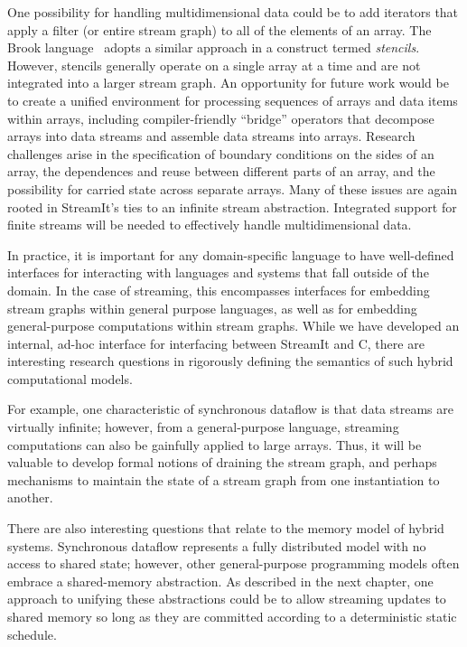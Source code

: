   One possibility for handling multidimensional data could be to add
  iterators that apply a filter (or entire stream graph) to all of the
  elements of an array.  The Brook language~\cite{brook04} adopts a
  similar approach in a construct termed {\it stencils}.  However,
  stencils generally operate on a single array at a time and are not
  integrated into a larger stream graph.  An opportunity for future
  work would be to create a unified environment for processing
  sequences of arrays and data items within arrays, including
  compiler-friendly ``bridge'' operators that decompose arrays into
  data streams and assemble data streams into arrays.  Research
  challenges arise in the specification of boundary conditions on the
  sides of an array, the dependences and reuse between different parts
  of an array, and the possibility for carried state across separate
  arrays.  Many of these issues are again rooted in StreamIt's ties to
  an infinite stream abstraction.  Integrated support for finite
  streams will be needed to effectively handle multidimensional data.

  In practice, it is important for any
  domain-specific language to have well-defined interfaces for
  interacting with languages and systems that fall outside of the
  domain.  In the case of streaming, this encompasses interfaces for
  embedding stream graphs within general purpose languages, as well as
  for embedding general-purpose computations within stream graphs.
  While we have developed an internal, ad-hoc interface for
  interfacing between StreamIt and C, there are interesting research
  questions in rigorously defining the semantics of such hybrid
  computational models. 

  For example, one characteristic of synchronous dataflow is that data
  streams are virtually infinite; however, from a general-purpose
  language, streaming computations can also be gainfully applied to
  large arrays.  Thus, it will be valuable to develop formal notions
  of draining the stream graph, and perhaps mechanisms to maintain the
  state of a stream graph from one instantiation to another.

  There are also interesting questions that relate to the memory model
  of hybrid systems.  Synchronous dataflow represents a fully
  distributed model with no access to shared state; however, other
  general-purpose programming models often embrace a shared-memory
  abstraction.  As described in the next chapter, one approach to
  unifying these abstractions could be to allow streaming updates to
  shared memory so long as they are committed according to a
  deterministic static schedule.

